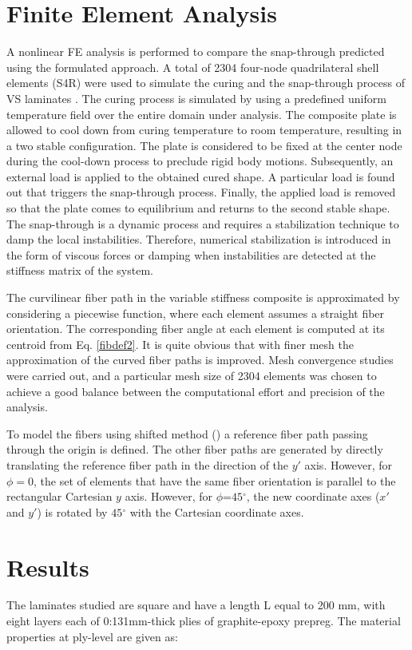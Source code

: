 \documentclass[journal]{new-aiaa}
\begin{document}
\section{Finite Element Analysis}
A nonlinear FE analysis is performed to compare the snap-through predicted using the formulated approach. A total of 2304 four-node quadrilateral shell elements (S4R) were used to simulate the curing and the snap-through process of VS laminates . The curing process is simulated by using a predefined uniform temperature field over the entire domain under analysis. The composite plate is allowed to cool down from curing temperature to room temperature, resulting in a two stable configuration. The plate is considered to be fixed at the center node during the cool-down process to preclude rigid body motions. Subsequently, an external load is applied to the obtained cured shape. 
A particular load is found out that triggers the snap-through process. Finally, the applied load is removed so that the plate comes to equilibrium and returns to the second stable shape. The snap-through is a dynamic process and requires a stabilization technique to damp the local instabilities. Therefore, numerical stabilization is introduced in the form of viscous forces or damping when instabilities are detected at the stiffness matrix of the system.

The curvilinear fiber path in the variable stiffness composite is approximated by considering a piecewise function, where each element assumes a straight fiber orientation. The corresponding fiber angle at each element is computed at its centroid from Eq. \ref{fibdef2}. It is quite obvious that with finer mesh the approximation of the curved fiber paths is improved. Mesh convergence studies were carried out, and a particular mesh size of 2304 elements was chosen to achieve a good balance between the computational effort and precision of the analysis. 

To model the fibers using shifted method (\cite{Waldhart1996}) a reference fiber path passing through the origin is defined. The other fiber paths are generated by directly translating the reference fiber path in the direction of the $y'$ axis. However, for $\phi=0$, the set of elements that have the same fiber orientation is parallel to the rectangular Cartesian $y$ axis. However, for $\phi$=$45{^\circ}$, the new coordinate axes ($x'$ and $y'$) is rotated by $45{^\circ}$ with the Cartesian coordinate axes. 



\section{Results}
The laminates studied are square and have a length L equal to 200 mm, with eight layers each of 0:131mm-thick plies of graphite-epoxy prepreg. The material properties at ply-level are given as:
\end{document}
